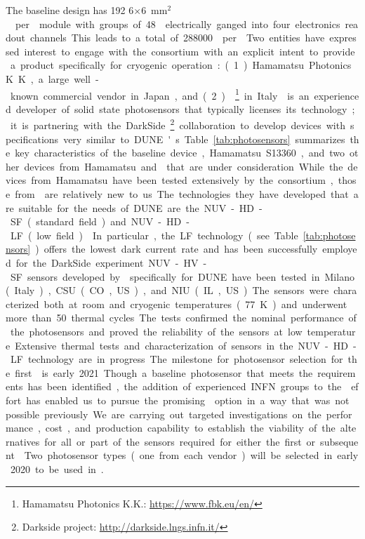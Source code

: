 The baseline  design has \num{192} \num{6}$\times$\SI{6}{mm$^2$}  per  module with groups of \num{48}  electrically ganged into four electronics readout channels. This leads to a total of \num{288000}  per . 

Two entities have expressed interest to engage with the consortium with an explicit intent to provide a product specifically for cryogenic operation: (1) Hamamatsu Photonics K.K., a large well-known commercial vendor in Japan, and (2) \footnote{Hamamatsu Photonics K.K.: \url{https://www.fbk.eu/en/}}
in Italy. 
 is an experienced developer of solid state photosensors that typically licenses its technology; it is partnering with the DarkSide\footnote{Darkside project: \url{http://darkside.lngs.infn.it/}} collaboration to develop devices with specifications very similar to DUNE's.  Table~\ref{tab:photosensors} summarizes the key characteristics of the baseline device, Hamamatsu S13360, and two other devices from Hamamatsu and  that are under consideration.

While the devices from Hamamatsu have been tested extensively by the consortium, those from  are relatively new to us. The technologies they have developed that are suitable for the needs of DUNE are the NUV-HD-SF (standard field) and NUV-HD-LF (low field)~\cite{Gola:2019idb}. In particular, the LF technology (see Table~\ref{tab:photosensors}) offers the lowest dark current rate and has been successfully employed for the DarkSide experiment. NUV-HV-SF sensors developed by  specifically for DUNE have been tested in Milano (Italy), CSU (CO, US), and NIU (IL, US). The sensors were characterized both at room and cryogenic temperatures (\SI{77}{K}) and underwent more than \num{50} thermal cycles. The tests confirmed the nominal performance of the photosensors and proved the reliability of the sensors at low temperature. Extensive thermal tests and characterization of sensors in the NUV-HD-LF technology are in progress.   

The milestone for photosensor selection for the first  is early 2021.  Though a baseline photosensor that meets the requirements has been identified, the addition of experienced INFN groups to the  effort has enabled us to pursue the promising  option in a way that was not possible previously.  We are carrying out targeted investigations on the performance, cost, and production capability to establish the viability of the alternatives for all or part of the sensors required for either the first or subsequent . Two photosensor types (one from each vendor) will be selected in early 2020 to be used in .

